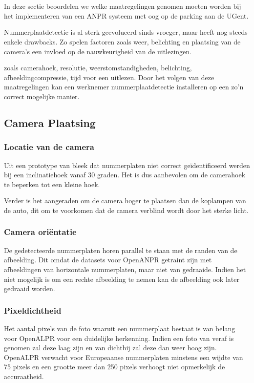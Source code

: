
\chapter{}
\label{ch:maatregelingenanpr}

In deze sectie beoordelen we welke maatregelingen genomen moeten worden bij het implementeren van een ANPR systeem met oog op de parking aan de UGent.

Nummerplaatdetectie is al sterk geevolueerd sinds vroeger, maar heeft nog steeds enkele drawbacks. Zo spelen factoren zoals weer, belichting en plaatsing van de camera's een invloed op de nauwkeurigheid van de uitlezingen.

zoals camerahoek, resolutie, weerstomstandigheden, belichting, afbeeldingcompressie, tijd voor een uitlezen. Door het volgen van deze maatregelingen kan een werknemer nummerplaatdetectie installeren op een zo'n correct mogelijke manier.

\section{Camera Plaatsing}

\subsection{Locatie van de camera}
Uit een prototype van \textcite{arrieta2019prototype} bleek dat nummerplaten niet correct geïdentificeerd werden bij een inclinatiehoek vanaf 30 graden. Het is dus aanbevolen om de camerahoek te beperken tot een kleine hoek.

Verder is het aangeraden om de camera hoger te plaatsen dan de koplampen van de auto, dit om te voorkomen dat de camera verblind wordt door het sterke licht.

\subsection{Camera oriëntatie}
De gedetecteerde nummerplaten horen parallel te staan met de randen van de afbeelding. Dit omdat de datasets voor OpenANPR getraint zijn met afbeeldingen van horizontale nummerplaten, maar niet van gedraaide. Indien het niet mogelijk is om een rechte afbeelding te nemen kan de afbeelding ook later gedraaid worden.

\subsection{Pixeldichtheid}
Het aantal pixels van de foto waaruit een nummerplaat bestaat is van belang voor OpenALPR voor een duidelijke herkenning. Indien een foto van veraf is genomen zal deze laag zijn en van dichtbij zal deze dan weer hoog zijn. OpenALPR verwacht voor Europeaanse nummerplaten minstens een wijdte van 75 pixels en een grootte meer dan 250 pixels verhoogt niet opmerkelijk de accuraatheid. \autocite{openalprcameraplacement}

